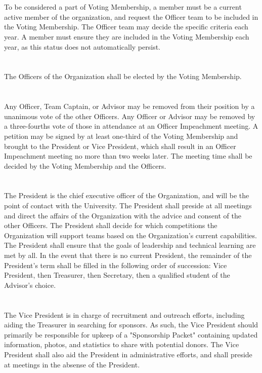 \documentclass[12pt]{cls/constitution}
\begin{document}
\section{}
To be considered a part of Voting Membership, a member must be a current active member of the organization, and request the Officer team to be included in the Voting Membership. The Officer team may decide the specific criteria each year. A member must ensure they are included in the Voting Membership each year, as this status does not automatically persist.

\section{}
The Officers of the Organization shall be elected by the Voting Membership.

\section{}
Any Officer, Team Captain, or Advisor may be removed from their position by a unanimous vote of the other Officers. Any Officer or Advisor may be removed by a three-fourths vote of those in attendance at an Officer Impeachment meeting. A petition may be signed by at least one-third of the Voting Membership and brought to the President or Vice President, which shall result in an Officer Impeachment meeting no more than two weeks later. The meeting time shall be decided by the Voting Membership and the Officers.

\section{}
The President is the chief executive officer of the Organization, and will be the point of contact with the University. The President shall preside at all meetings and direct the affairs of the Organization with the advice and consent of the other Officers. The President shall decide for which competitions the Organization will support teams based on the Organization's current capabilities. The President shall ensure that the goals of leadership and technical learning are met by all. In the event that there is no current President, the remainder of the President’s term shall be filled in the following order of succession:  Vice President, then Treasurer, then Secretary, then a qualified student of the Advisor’s choice.

\section{}
The Vice President is in charge of recruitment and outreach efforts, including aiding the Treasurer in searching for sponsors. As such, the Vice President should primarily be responsible for upkeep of a "Sponsorship Packet" containing updated information, photos, and statistics to share with potential donors. The Vice President shall also aid the President in administrative efforts, and shall preside at meetings in the absense of the President.
\end{document}
